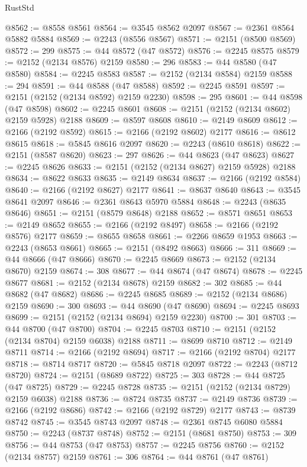\begin{lexlean}{RustStd}
\begin{coremodule}
@8562 := @8558 @8561
@8564 := @3545 @8562 @2097
@8567 := @2361 @8564 @5882 @5884
@8569 := @2243 (@8556 @8567)
@8571 := @2151 (@8500 @8569)
@8572 := 299
@8575 := @44 @8572 (@47 @8572)
@8576 := @2245 @8575
@8579 := @2152 (@2134 @8576) @2159
@8580 := 296
@8583 := @44 @8580 (@47 @8580)
@8584 := @2245 @8583
@8587 := @2152 (@2134 @8584) @2159
@8588 := 294
@8591 := @44 @8588 (@47 @8588)
@8592 := @2245 @8591
@8597 := @2151 (@2152 (@2134 @8592) @2159 @2230)
@8598 := 295
@8601 := @44 @8598 (@47 @8598)
@8602 := @2245 @8601
@8608 := @2151 (@2152 (@2134 @8602) @2159 @5928) @2188
@8609 := @8597 @8608
@8610 := @2149 @8609
@8612 := @2166 (@2192 @8592)
@8615 := @2166 (@2192 @8602) @2177
@8616 := @8612 @8615
@8618 := @5845 @8616 @2097
@8620 := @2243 (@8610 @8618)
@8622 := @2151 (@8587 @8620)
@8623 := 297
@8626 := @44 @8623 (@47 @8623)
@8627 := @2245 @8626
@8633 := @2151 (@2152 (@2134 @8627) @2159 @5928) @2188
@8634 := @8622 @8633
@8635 := @2149 @8634
@8637 := @2166 (@2192 @8584)
@8640 := @2166 (@2192 @8627) @2177
@8641 := @8637 @8640
@8643 := @3545 @8641 @2097
@8646 := @2361 @8643 @5970 @5884
@8648 := @2243 (@8635 @8646)
@8651 := @2151 (@8579 @8648) @2188
@8652 := @8571 @8651
@8653 := @2149 @8652
@8655 := @2166 (@2192 @8497)
@8658 := @2166 (@2192 @8576) @2177
@8659 := @8655 @8658
@8661 := @2266 @8659 @1953
@8663 := @2243 (@8653 @8661)
@8665 := @2151 (@8492 @8663)
@8666 := 311
@8669 := @44 @8666 (@47 @8666)
@8670 := @2245 @8669
@8673 := @2152 (@2134 @8670) @2159
@8674 := 308
@8677 := @44 @8674 (@47 @8674)
@8678 := @2245 @8677
@8681 := @2152 (@2134 @8678) @2159
@8682 := 302
@8685 := @44 @8682 (@47 @8682)
@8686 := @2245 @8685
@8689 := @2152 (@2134 @8686) @2159
@8690 := 300
@8693 := @44 @8690 (@47 @8690)
@8694 := @2245 @8693
@8699 := @2151 (@2152 (@2134 @8694) @2159 @2230)
@8700 := 301
@8703 := @44 @8700 (@47 @8700)
@8704 := @2245 @8703
@8710 := @2151 (@2152 (@2134 @8704) @2159 @6038) @2188
@8711 := @8699 @8710
@8712 := @2149 @8711
@8714 := @2166 (@2192 @8694)
@8717 := @2166 (@2192 @8704) @2177
@8718 := @8714 @8717
@8720 := @5845 @8718 @2097
@8722 := @2243 (@8712 @8720)
@8724 := @2151 (@8689 @8722)
@8725 := 303
@8728 := @44 @8725 (@47 @8725)
@8729 := @2245 @8728
@8735 := @2151 (@2152 (@2134 @8729) @2159 @6038) @2188
@8736 := @8724 @8735
@8737 := @2149 @8736
@8739 := @2166 (@2192 @8686)
@8742 := @2166 (@2192 @8729) @2177
@8743 := @8739 @8742
@8745 := @3545 @8743 @2097
@8748 := @2361 @8745 @6080 @5884
@8750 := @2243 (@8737 @8748)
@8752 := @2151 (@8681 @8750)
@8753 := 309
@8756 := @44 @8753 (@47 @8753)
@8757 := @2245 @8756
@8760 := @2152 (@2134 @8757) @2159
@8761 := 306
@8764 := @44 @8761 (@47 @8761)

\end{coremodule}
\end{lexlean}
